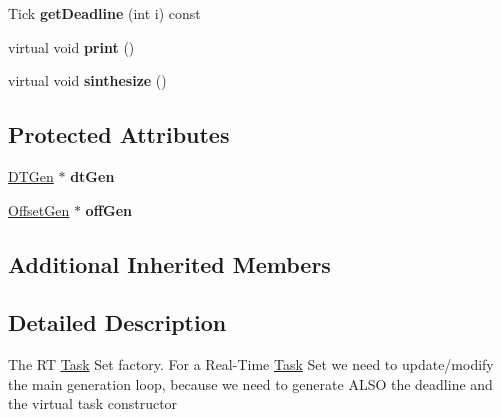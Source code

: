 \begin{DoxyCompactItemize}
\item 
Tick {\bfseries get\+Deadline} (int i) const \hypertarget{classRTSim_1_1RandomRTTaskSetFactory_a9feb3d2d4033f40635f4c5cc9260bf3d}{}\label{classRTSim_1_1RandomRTTaskSetFactory_a9feb3d2d4033f40635f4c5cc9260bf3d}

\item 
virtual void {\bfseries print} ()\hypertarget{classRTSim_1_1RandomRTTaskSetFactory_a6833ef006ba5107505fd58fc0e0391cf}{}\label{classRTSim_1_1RandomRTTaskSetFactory_a6833ef006ba5107505fd58fc0e0391cf}

\item 
virtual void {\bfseries sinthesize} ()\hypertarget{classRTSim_1_1RandomRTTaskSetFactory_a28778151a44c041e55407ea823836f62}{}\label{classRTSim_1_1RandomRTTaskSetFactory_a28778151a44c041e55407ea823836f62}

\end{DoxyCompactItemize}
\subsection*{Protected Attributes}
\begin{DoxyCompactItemize}
\item 
\hyperlink{classRTSim_1_1DTGen}{D\+T\+Gen} $\ast$ {\bfseries dt\+Gen}\hypertarget{classRTSim_1_1RandomRTTaskSetFactory_ad10f6944eb2b2ea384da18f7fc0c0b3a}{}\label{classRTSim_1_1RandomRTTaskSetFactory_ad10f6944eb2b2ea384da18f7fc0c0b3a}

\item 
\hyperlink{classRTSim_1_1OffsetGen}{Offset\+Gen} $\ast$ {\bfseries off\+Gen}\hypertarget{classRTSim_1_1RandomRTTaskSetFactory_acf89682dc64e81dd7361a0a1fbdcfb47}{}\label{classRTSim_1_1RandomRTTaskSetFactory_acf89682dc64e81dd7361a0a1fbdcfb47}

\end{DoxyCompactItemize}
\subsection*{Additional Inherited Members}


\subsection{Detailed Description}
The RT \hyperlink{classRTSim_1_1Task}{Task} Set factory. For a Real-\/\+Time \hyperlink{classRTSim_1_1Task}{Task} Set we need to update/modify the main generation loop, because we need to generate A\+L\+SO the deadline and the virtual task constructor

